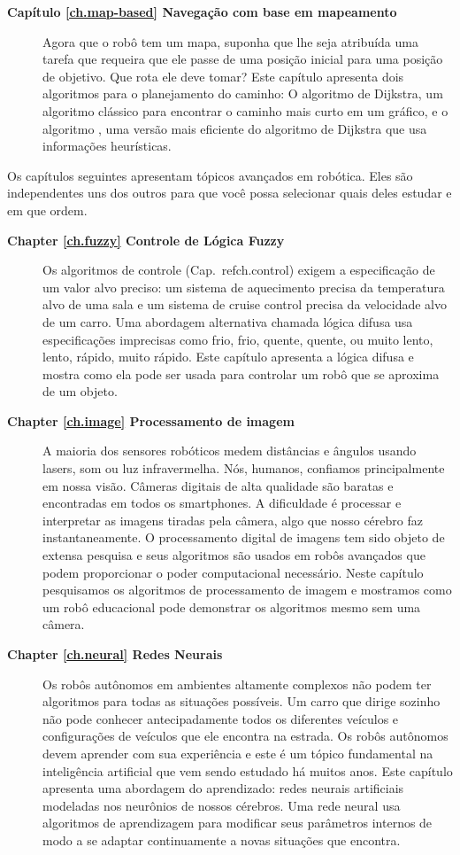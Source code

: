 \begin{description}
\smallskip
\item [\textbf{Capítulo \ref{ch.map-based} Navegação com base em mapeamento}] Agora que o robô tem um mapa, suponha que lhe seja atribuída uma tarefa que requeira que ele passe de uma posição inicial para uma posição de objetivo. Que rota ele deve tomar? Este capítulo apresenta dois algoritmos para o planejamento do caminho: O algoritmo de Dijkstra, um algoritmo clássico para encontrar o caminho mais curto em um gráfico, e o algoritmo \astar{}, uma versão mais eficiente do algoritmo de Dijkstra que usa informações heurísticas.
\end{description}

Os capítulos seguintes apresentam tópicos avançados em robótica. Eles são independentes uns dos outros para que você possa selecionar quais deles estudar e em que ordem.
\begin{description}
\item [\textbf{Chapter \ref{ch.fuzzy} Controle de Lógica Fuzzy}] Os algoritmos de controle (Cap.~ref{ch.control}) exigem a especificação de um valor alvo preciso: um sistema de aquecimento precisa da temperatura alvo de uma sala e um sistema de cruise control precisa da velocidade alvo de um carro. Uma abordagem alternativa chamada lógica difusa usa especificações imprecisas como frio, frio, quente, quente, ou muito lento, lento, rápido, muito rápido. Este capítulo apresenta a lógica difusa e mostra como ela pode ser usada para controlar um robô que se aproxima de um objeto.
\smallskip
\item [\textbf{Chapter \ref{ch.image} Processamento de imagem}] A maioria dos sensores robóticos medem distâncias e ângulos usando lasers, som ou luz infravermelha. Nós, humanos, confiamos principalmente em nossa visão. Câmeras digitais de alta qualidade são baratas e encontradas em todos os smartphones. A dificuldade é processar e interpretar as imagens tiradas pela câmera, algo que nosso cérebro faz instantaneamente. O processamento digital de imagens tem sido objeto de extensa pesquisa e seus algoritmos são usados em robôs avançados que podem proporcionar o poder computacional necessário. Neste capítulo pesquisamos os algoritmos de processamento de imagem e mostramos como um robô educacional pode demonstrar os algoritmos mesmo sem uma câmera.
\smallskip
\item [\textbf{Chapter \ref{ch.neural} Redes Neurais}] Os robôs autônomos em ambientes altamente complexos não podem ter algoritmos para todas as situações possíveis. Um carro que dirige sozinho não pode conhecer antecipadamente todos os diferentes veículos e configurações de veículos que ele encontra na estrada. Os robôs autônomos devem aprender com sua experiência e este é um tópico fundamental na inteligência artificial que vem sendo estudado há muitos anos. Este capítulo apresenta uma abordagem do aprendizado: redes neurais artificiais modeladas nos neurônios de nossos cérebros. Uma rede neural usa algoritmos de aprendizagem para modificar seus parâmetros internos de modo a se adaptar continuamente a novas situações que encontra.

\end{description}
